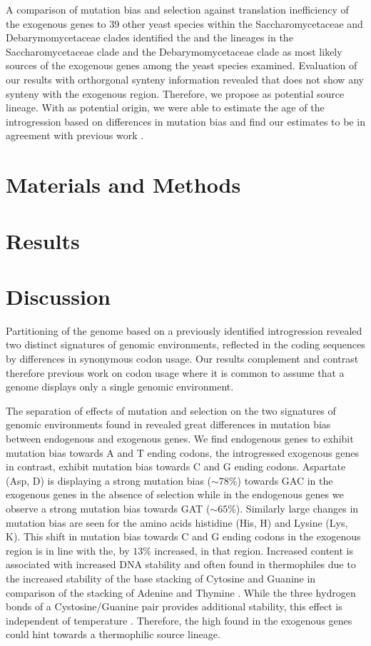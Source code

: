\documentclass[12pt, letter]{article}
\begin{document}
A comparison of mutation bias and selection against translation inefficiency of the exogenous genes to 39 other yeast species within the Saccharomycetaceae and Debarymomycetaceae clades identified the \gossypii and the \dubl lineages in the Saccharomycetaceae clade and the Debarymomycetaceae clade as most likely sources of the exogenous genes among the yeast species examined.
Evaluation of our results with orthorgonal synteny information revealed that \dubl does not show any synteny with the exogenous region.
Therefore, we propose \gossypii as potential source lineage.
With \gossypii as potential origin, we were able to estimate the age of the introgression based on differences in mutation bias and find our estimates to be in agreement with previous work \citep{friedrich2015}.

\section*{Materials and Methods}

\section*{Results}

\section*{Discussion}

Partitioning of the \kluyveri genome based on a previously identified introgression revealed two distinct signatures of genomic environments, reflected in the coding sequences by differences in synonymous codon usage.
Our results complement and contrast therefore previous work on codon usage where it is common to assume that a genome displays only a single genomic environment.

The separation of effects of mutation and selection on the two signatures of genomic environments found in \kluyveri revealed great differences in mutation bias between endogenous and exogenous genes.
We find endogenous genes to exhibit mutation bias towards A and T ending codons, the introgressed exogenous genes in contrast, exhibit mutation bias towards C and G ending codons.
Aspartate (Asp, D) is displaying a strong mutation bias ($\sim 78 \%$) towards GAC in the exogenous genes in the absence of selection while in the endogenous genes we observe a strong mutation bias towards GAT ($\sim 65 \%$).
Similarly large changes in mutation bias are seen for the amino acids histidine (His, H) and Lysine (Lys, K). 
This shift in mutation bias towards C and G ending codons in the exogenous region is in line with the, by $13 \%$ increased, \GC in that region.
Increased \GC content is associated with increased DNA stability \citep{marmur1962, wartell1985, williams2002, SantaLucia2004} and often found in thermophiles due to the increased stability of the base stacking of Cytosine and Guanine in comparison of the stacking of Adenine and Thymine \citep{yakovchuk2006}.
While the three hydrogen bonds of a Cystosine/Guanine pair provides additional stability, this effect is independent of temperature \citep{yakovchuk2006}.
Therefore, the high \GC found in the exogenous genes could hint towards a thermophilic source lineage.
\end{document}
